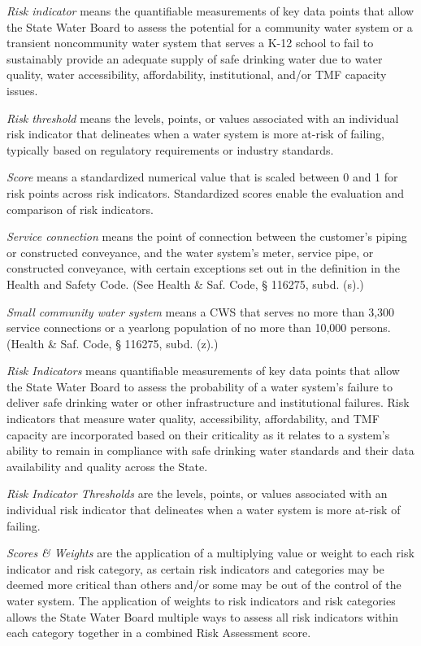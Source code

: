 \documentclass[
  letterpaper,
  DIV=11,
  numbers=noendperiod]{scrartcl}
\begin{document}
\emph{Risk indicator} means the quantifiable measurements of key data
points that allow the State Water Board to assess the potential for a
community water system or a transient noncommunity water system that
serves a K-12 school to fail to sustainably provide an adequate supply
of safe drinking water due to water quality, water accessibility,
affordability, institutional, and/or TMF capacity issues.

\emph{Risk threshold} means the levels, points, or values associated
with an individual risk indicator that delineates when a water system is
more at-risk of failing, typically based on regulatory requirements or
industry standards.

\emph{Score} means a standardized numerical value that is scaled between
0 and 1 for risk points across risk indicators. Standardized scores
enable the evaluation and comparison of risk indicators.

\emph{Service connection} means the point of connection between the
customer's piping or constructed conveyance, and the water system's
meter, service pipe, or constructed conveyance, with certain exceptions
set out in the definition in the Health and Safety Code. (See Health \&
Saf. Code, § 116275, subd. (s).)

\emph{Small community water system} means a CWS that serves no more than
3,300 service connections or a yearlong population of no more than
10,000 persons. (Health \& Saf. Code, § 116275, subd. (z).)

\emph{Risk Indicators} means quantifiable measurements of key data
points that allow the State Water Board to assess the probability of a
water system's failure to deliver safe drinking water or other
infrastructure and institutional failures. Risk indicators that measure
water quality, accessibility, affordability, and TMF capacity are
incorporated based on their criticality as it relates to a system's
ability to remain in compliance with safe drinking water standards and
their data availability and quality across the State.

\emph{Risk Indicator Thresholds} are the levels, points, or values
associated with an individual risk indicator that delineates when a
water system is more at-risk of failing.

\emph{Scores \& Weights} are the application of a multiplying value or
weight to each risk indicator and risk category, as certain risk
indicators and categories may be deemed more critical than others and/or
some may be out of the control of the water system. The application of
weights to risk indicators and risk categories allows the State Water
Board multiple ways to assess all risk indicators within each category
together in a combined Risk Assessment score.
\end{document}

